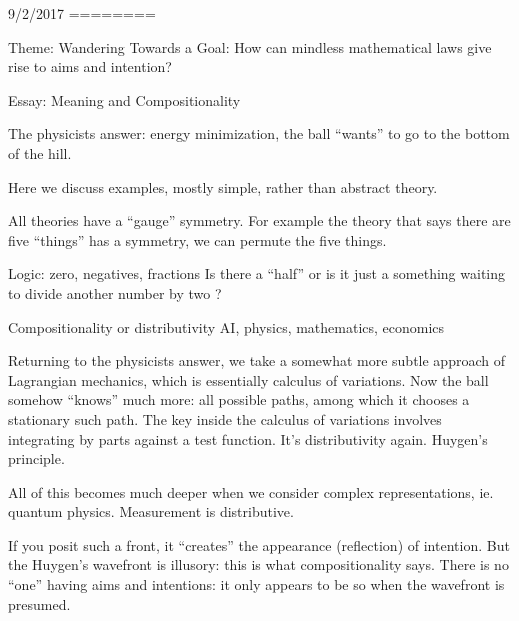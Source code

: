 

9/2/2017
========

Theme: 
Wandering Towards a Goal: How can mindless mathematical laws give rise to aims and intention?

Essay:
Meaning and Compositionality

The physicists answer: energy minimization, the ball ``wants'' to
go to the bottom of the hill.

Here we discuss examples, mostly simple, rather than abstract theory.

All theories have a ``gauge'' symmetry. For example the theory that
says there are five ``things'' has a symmetry, we can permute the five
things.

Logic: zero, negatives, fractions
Is there a ``half'' or is it just a something waiting
to divide another number by two ?

Compositionality or distributivity
AI, physics, mathematics, economics

Returning to the physicists answer, we take a somewhat
more subtle approach of Lagrangian mechanics, which is
essentially calculus of variations. Now the ball somehow
``knows'' much more: all possible paths, among which it
chooses a stationary such path.
The key inside the calculus of variations involves integrating
by parts against a test function. It's distributivity again.
Huygen's principle.

All of this becomes much deeper when we consider complex
representations, ie. quantum physics.
Measurement is distributive.

If you posit such a front, it ``creates'' the appearance (reflection)
of intention. 
But the Huygen's wavefront is illusory: this is what compositionality says. 
There is no ``one'' having aims and intentions: it only appears to
be so when the wavefront is presumed.





